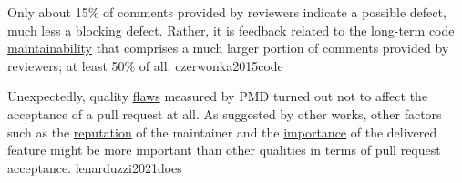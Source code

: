 \documentclass{article}
\begin{document}


  {Only about 15\% of comments provided by reviewers indicate a possible defect, much less a blocking defect. Rather, it is feedback related to the long-term code \ul{maintainability} that comprises a much larger portion of comments provided by reviewers; at least 50\% of all.}
  {czerwonka2015code}

  {Unexpectedly, quality \ul{flaws} measured by PMD turned out not to affect the acceptance of a pull request at all. As suggested by other works, other factors such as the \ul{reputation} of the maintainer and the \ul{importance} of the delivered feature might be more important than other qualities in terms of pull request acceptance.}
  {lenarduzzi2021does}
\end{document}
